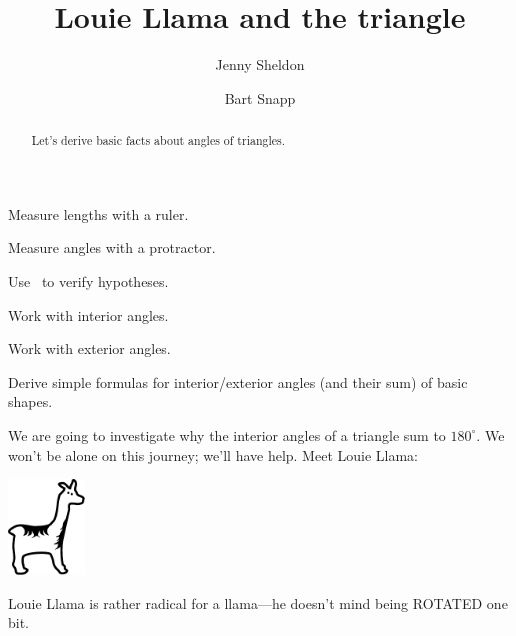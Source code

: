 \documentclass[nooutcomes,noauthor,handout]{ximera}
\title{Louie Llama and the triangle}
\author{Jenny Sheldon \and Bart Snapp}
\begin{document}
\begin{abstract}
  Let's derive basic facts about angles of triangles.
\end{abstract}
\maketitle


\begin{listOutcomes}
\item Measure lengths with a ruler. 
\item Measure angles with a protractor.
\item Use \snap\ to verify hypotheses.
\item Work with interior angles.
\item Work with exterior angles.
\item Derive simple formulas for interior/exterior angles (and their
  sum) of basic shapes.
\end{listOutcomes}

We are going to investigate why the interior angles of a triangle sum
to $180^\circ$. We won't be alone on this journey; we'll have help.
Meet Louie Llama:
\begin{center}
\includegraphics[height=1in]{llama.pdf}
\end{center}

Louie Llama is rather radical for a llama---he doesn't mind being
ROTATED one bit.

\mynewpage
\end{document}
